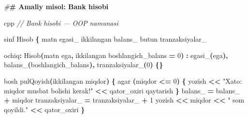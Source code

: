 \documentclass[a4paper,11pt,twoside,openright]{book}
\newenvironment{Shaded}{\begin{snugshade}}{\end{snugshade}}
\newcommand{\CommentTok}[1]{\textcolor[rgb]{0.56,0.35,0.01}{\textit{#1}}}
\newcommand{\DecValTok}[1]{\textcolor[rgb]{0.00,0.00,0.81}{#1}}
\newcommand{\ErrorTok}[1]{\textcolor[rgb]{0.64,0.00,0.00}{\textbf{#1}}}
\newcommand{\NormalTok}[1]{#1}
\newcommand{\OperatorTok}[1]{\textcolor[rgb]{0.81,0.36,0.00}{\textbf{#1}}}
\newcommand{\PreprocessorTok}[1]{\textcolor[rgb]{0.56,0.35,0.01}{\textit{#1}}}
\newcommand{\StringTok}[1]{\textcolor[rgb]{0.31,0.60,0.02}{#1}}
\newcommand{\VariableTok}[1]{\textcolor[rgb]{0.00,0.00,0.00}{#1}}
\begin{document}
\begin{Shaded}
\begin{Highlighting}[]
\PreprocessorTok{\#}\ErrorTok{\# Amaliy misol: Bank hisobi}

\ErrorTok{\textasciigrave{}\textasciigrave{}\textasciigrave{}}\NormalTok{cpp}
\CommentTok{// Bank hisobi — OOP namunasi}

\NormalTok{sinf Hisob }\OperatorTok{\{}
\NormalTok{    matn }\VariableTok{egasi\_}
\NormalTok{    ikkilangan }\VariableTok{balans\_}
\NormalTok{    butun }\VariableTok{tranzaksiyalar\_}

\NormalTok{ochiq}\OperatorTok{:}
\NormalTok{    Hisob}\OperatorTok{(}\NormalTok{matn ega}\OperatorTok{,}\NormalTok{ ikkilangan boshlangich\_balans }\OperatorTok{=} \DecValTok{0}\OperatorTok{)}
        \OperatorTok{:} \VariableTok{egasi\_}\OperatorTok{(}\NormalTok{ega}\OperatorTok{),} \VariableTok{balans\_}\OperatorTok{(}\NormalTok{boshlangich\_balans}\OperatorTok{),} \VariableTok{tranzaksiyalar\_}\OperatorTok{(}\DecValTok{0}\OperatorTok{)} \OperatorTok{\{\}}

\NormalTok{    bosh pulQoyish}\OperatorTok{(}\NormalTok{ikkilangan miqdor}\OperatorTok{)} \OperatorTok{\{}
\NormalTok{        agar }\OperatorTok{(}\NormalTok{miqdor }\OperatorTok{\textless{}=} \DecValTok{0}\OperatorTok{)} \OperatorTok{\{}
\NormalTok{            yozish }\OperatorTok{\textless{}\textless{}} \StringTok{"Xato: miqdor musbat bo\textquotesingle{}lishi kerak!"} \OperatorTok{\textless{}\textless{}}\NormalTok{ qator\_oxiri}
\NormalTok{            qaytarish}
        \OperatorTok{\}}
        \VariableTok{balans\_} \OperatorTok{=} \VariableTok{balans\_} \OperatorTok{+}\NormalTok{ miqdor}
        \VariableTok{tranzaksiyalar\_} \OperatorTok{=} \VariableTok{tranzaksiyalar\_} \OperatorTok{+} \DecValTok{1}
\NormalTok{        yozish }\OperatorTok{\textless{}\textless{}}\NormalTok{ miqdor }\OperatorTok{\textless{}\textless{}} \StringTok{" so\textquotesingle{}m qo\textquotesingle{}yildi."} \OperatorTok{\textless{}\textless{}}\NormalTok{ qator\_oxiri}
    \OperatorTok{\}}


\end{Highlighting}
\end{Shaded}
\end{document}

